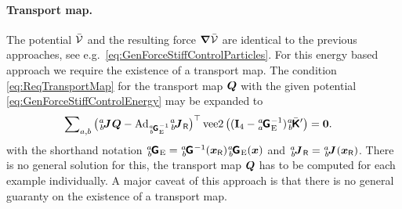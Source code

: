 \paragraph{Transport map.}
The potential $\bar{\mathcal{V}}$ and the resulting force $\boldsymbol{\nabla} \bar{\mathcal{V}}$ are identical to the previous approaches, see e.g.\ \eqref{eq:GenForceStiffControlParticles}.
For this energy based approach we require the existence of a transport map.
The condition \eqref{eq:ReqTransportMap} for the transport map $\boldsymbol{Q}$ with the given potential \eqref{eq:GenForceStiffControlEnergy} may be expanded to
\begin{align}
 \sumBodiesAB \big( \bodyJac{\BidxI}{\BidxII} \sysTransportMap - \Ad{\bodyHomoCoordE{\BidxI}{\BidxII}^{-1}} \bodyJacR{\BidxI}{\BidxII}\big)^\top \veeTwoOp\big((\idMat[4]-\bodyHomoCoordE{\BidxI}{\BidxI}^{-1})\bodyStiffMatCp{\BidxI}{\BidxII}\big) &= \tuple{0}.
\end{align}
with the shorthand notation $\bodyHomoCoordE{\BidxI}{\BidxII} = \bodyHomoCoord{\BidxI}{\BidxII}^{-1}(\sysCoordR) \bodyHomoCoordE{\BidxI}{\BidxII}(\sysCoord)$ and $\bodyJacR{\BidxI}{\BidxII} = \bodyJac{\BidxI}{\BidxII}(\sysCoordR)$.
There is no general solution for this, the transport map $\boldsymbol{Q}$ has to be computed for each example individually.
A major caveat of this approach is that there is no general guaranty on the existence of a transport map.

